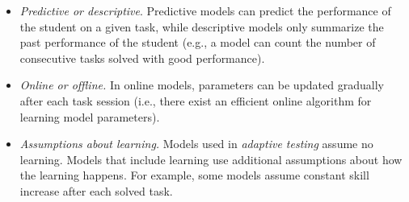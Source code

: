 \begin{itemize}
\item \emph{Predictive or descriptive}.
Predictive models can predict the performance of the student on a given task,
while descriptive models only summarize the past performance of the student
(e.g., a model can count the number of consecutive tasks solved with good performance).
\item \emph{Online or offline.}
In online models, parameters can be updated gradually after each task session
(i.e., there exist an efficient online algorithm for learning model parameters).
\item \emph{Assumptions about learning.}
Models used in \emph{adaptive testing} \cite{cat} assume no learning.
Models that include learning use additional assumptions
about how the learning happens. %
For example, some models assume constant skill increase after each solved task.
\end{itemize}


